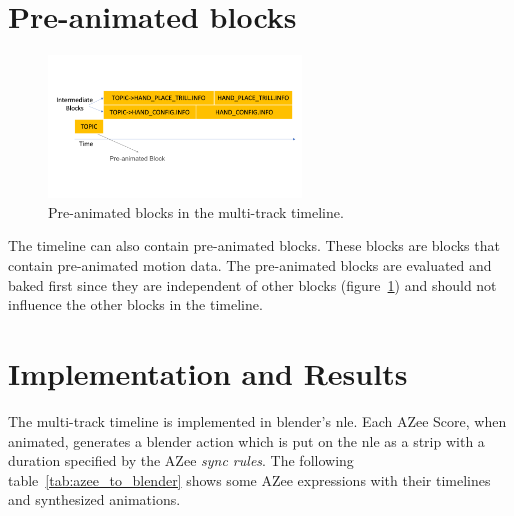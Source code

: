 \documentclass[../../main.tex]{subfiles}
\begin{document}
\section{Pre-animated blocks}
\label{ch:multi_track:preanim_blocks}

\begin{figure}[H]
    \centering
    \includegraphics[width=0.6\textwidth]{chapters/multi_track/images/preanim_blocks.png}
    \caption{Pre-animated blocks in the multi-track timeline.}
    \label{fig:preanim_blocks}
\end{figure}

The timeline can also contain pre-animated blocks. These blocks are blocks that contain pre-animated motion data. The pre-animated blocks are evaluated and baked first since they are independent of other blocks (figure~\ref{fig:preanim_blocks}) and should not influence the other blocks in the timeline.

\section{Implementation and Results}
\label{ch:multi_track:implem_results}

The multi-track timeline is implemented in blender's \gls{nle}. Each AZee Score, when animated, generates a blender action which is put on the \gls{nle} as a strip with a duration specified by the AZee \emph{sync rules}. The following table~\ref{tab:azee_to_blender} shows some AZee expressions with their timelines and synthesized animations.
\end{document}
